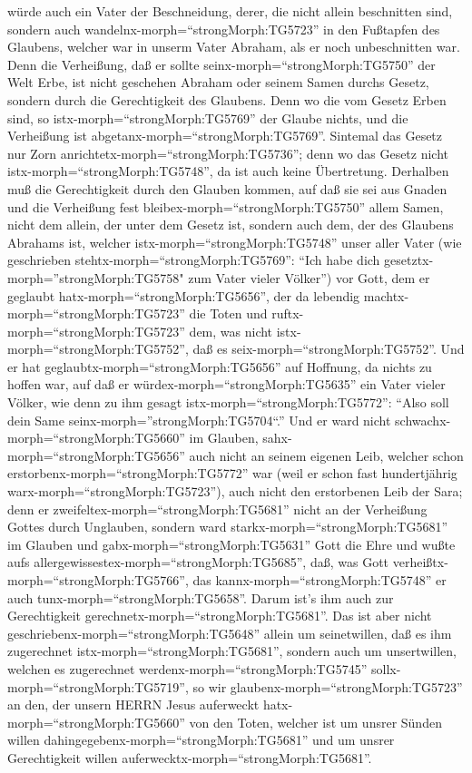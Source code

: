 würde auch ein Vater der Beschneidung, derer, die nicht allein
beschnitten sind, sondern auch wandelnx-morph=``strongMorph:TG5723'' in
den Fußtapfen des Glaubens, welcher war in unserm Vater Abraham, als er
noch unbeschnitten war.  Denn die Verheißung, daß er sollte
seinx-morph=``strongMorph:TG5750'' der Welt Erbe, ist nicht geschehen
Abraham oder seinem Samen durchs Gesetz, sondern durch die Gerechtigkeit
des Glaubens.  Denn wo die vom Gesetz Erben sind, so
istx-morph=``strongMorph:TG5769'' der Glaube nichts, und die Verheißung
ist abgetanx-morph=``strongMorph:TG5769''.  Sintemal das
Gesetz nur Zorn anrichtetx-morph=``strongMorph:TG5736''; denn wo das
Gesetz nicht istx-morph=``strongMorph:TG5748'', da ist auch keine
Übertretung.  Derhalben muß die Gerechtigkeit durch den
Glauben kommen, auf daß sie sei aus Gnaden und die Verheißung fest
bleibex-morph=``strongMorph:TG5750'' allem Samen, nicht dem allein, der
unter dem Gesetz ist, sondern auch dem, der des Glaubens Abrahams ist,
welcher istx-morph=``strongMorph:TG5748'' unser aller Vater
 (wie geschrieben stehtx-morph=``strongMorph:TG5769'':
``Ich habe dich gesetztx-morph=''strongMorph:TG5758" zum Vater vieler
Völker'') vor Gott, dem er geglaubt hatx-morph=``strongMorph:TG5656'',
der da lebendig machtx-morph=``strongMorph:TG5723'' die Toten und
ruftx-morph=``strongMorph:TG5723'' dem, was nicht
istx-morph=``strongMorph:TG5752'', daß es
seix-morph=``strongMorph:TG5752''.  Und er hat
geglaubtx-morph=``strongMorph:TG5656'' auf Hoffnung, da nichts zu hoffen
war, auf daß er würdex-morph=``strongMorph:TG5635'' ein Vater vieler
Völker, wie denn zu ihm gesagt istx-morph=``strongMorph:TG5772'': ``Also
soll dein Same seinx-morph=''strongMorph:TG5704``.''  Und
er ward nicht schwachx-morph=``strongMorph:TG5660'' im Glauben,
sahx-morph=``strongMorph:TG5656'' auch nicht an seinem eigenen Leib,
welcher schon erstorbenx-morph=``strongMorph:TG5772'' war (weil er schon
fast hundertjährig warx-morph=``strongMorph:TG5723''), auch nicht den
erstorbenen Leib der Sara;  denn er
zweifeltex-morph=``strongMorph:TG5681'' nicht an der Verheißung Gottes
durch Unglauben, sondern ward starkx-morph=``strongMorph:TG5681'' im
Glauben und gabx-morph=``strongMorph:TG5631'' Gott die Ehre
 und wußte aufs
allergewissestex-morph=``strongMorph:TG5685'', daß, was Gott
verheißtx-morph=``strongMorph:TG5766'', das
kannx-morph=``strongMorph:TG5748'' er auch
tunx-morph=``strongMorph:TG5658''.  Darum ist's ihm auch
zur Gerechtigkeit gerechnetx-morph=``strongMorph:TG5681''. 
Das ist aber nicht geschriebenx-morph=``strongMorph:TG5648'' allein um
seinetwillen, daß es ihm zugerechnet istx-morph=``strongMorph:TG5681'',
 sondern auch um unsertwillen, welchen es zugerechnet
werdenx-morph=``strongMorph:TG5745'' sollx-morph=``strongMorph:TG5719'',
so wir glaubenx-morph=``strongMorph:TG5723'' an den, der unsern HERRN
Jesus auferweckt hatx-morph=``strongMorph:TG5660'' von den Toten,
 welcher ist um unsrer Sünden willen
dahingegebenx-morph=``strongMorph:TG5681'' und um unsrer Gerechtigkeit
willen auferwecktx-morph=``strongMorph:TG5681''.


